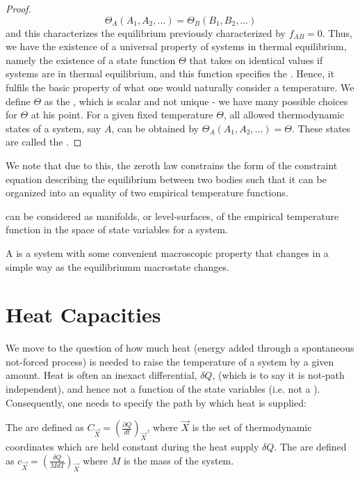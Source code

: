 \documentclass[12pt, a4paper, oneside, openright, titlepage]{book}
\begin{document}
\begin{proof}
\begin{equation*}
        \Theta_A(A_1,A_2,...) = \Theta_B(B_1,B_2,...)
    \end{equation*}
    and this characterizes the equilibrium previously characterized by $f_{AB} = 0$. Thus, we have the existence of a universal property of systems in thermal equilibrium, namely the existence of a state function $\Theta$ that takes on identical values if systems are in thermal equilibrium, and this function specifies the . Hence, it fulfils the basic property of what one would naturally consider a temperature. We define $\Theta$ as the , which is scalar and not unique - we have many possible choices for $\Theta$ at his point. For a given fixed temperature $\Theta$, all allowed thermodynamic states of a system, say $A$, can be obtained by $\Theta_A(A_1,A_2,...) = \Theta$. These states are called the .
\end{proof}

We note that due to this, the zeroth law constrains the form of the constraint equation describing the equilibrium between two bodies such that it can be organized into an equality of two empirical temperature functions. 

\begin{rmk}
     can be considered as manifolds, or level-surfaces, of the empirical temperature function in the space of state variables for a system.
\end{rmk}

\begin{defn}
    A  is a system with some convenient macroscopic property that changes in a simple way as the equilibriumm macrostate changes.
\end{defn}


\section{Heat Capacities}

We move to the question of how much heat (energy added through a spontaneous not-forced process) is needed to raise the temperature of a system by a given amount. Heat is often an inexact differential, $\delta Q$, (which is to say it is not-path independent), and hence not a function of the state variables (i.e. not a ). Consequently, one needs to specify the path by which heat is supplied:

\begin{defn}
    The  are defined as $C_{\vec{X}} = \left(\frac{\partial Q}{dt}\right)_{\vec{X}}$, where $\vec{X}$ is the set of thermodynamic coordinates which are held constant during the heat supply $\delta Q$. The  are defined as $c_{\vec{X}} = \left(\frac{\delta Q}{MdT}\right)_{\vec{X}}$ where $M$ is the mass of the system.
\end{defn}
\end{document}
